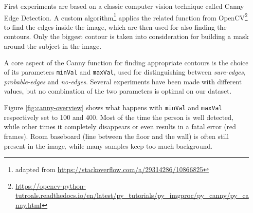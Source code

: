 First experiments are based on a classic computer vision technique called Canny Edge Detection. A custom algorithm\footnote{adapted from \url{https://stackoverflow.com/a/29314286/10866825}} applies the related function from OpenCV\footnote{\url{https://opencv-python-tutroals.readthedocs.io/en/latest/py_tutorials/py_imgproc/py_canny/py_canny.html}} to find the edges inside the image, which are then used for also finding the contours. Only the biggest contour is taken into consideration for building a mask around the subject in the image.

\medskip

A core aspect of the Canny function for finding appropriate contours is the choice of its parameters \texttt{minVal} and \texttt{maxVal}, used for distinguishing between \textit{sure-edges}, \textit{probable-edges} and \textit{no-edges}. Several experiments have been made with different values, but no combination of the two parameters is optimal on our dataset.

Figure \ref{fig:canny-overview} shows what happens with \texttt{minVal} and \texttt{maxVal} respectively set to 100 and 400. Most of the time the person is well detected, while other times it completely disappears or even results in a fatal error (red frames). Room baseboard (line between the floor and the wall) is often still present in the image, while many samples keep too much background.

\medskip

